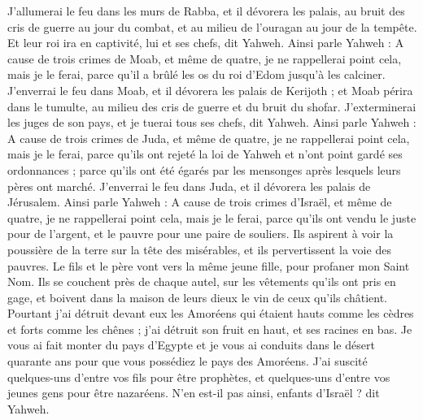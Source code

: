 \begin{multicols}{2}
J'allumerai le feu dans les murs de Rabba, et il dévorera les palais, au bruit des cris de guerre au jour du combat, et au milieu de l’ouragan au jour de la tempête.
Et leur roi ira en captivité, lui et ses chefs, dit Yahweh.
\VerseOne{}Ainsi parle Yahweh : A cause de trois crimes de Moab, et même de quatre, je ne rappellerai point cela, mais je le ferai, parce qu'il a brûlé les os du roi d'Edom jusqu’à les calciner.
J'enverrai le feu dans Moab, et il dévorera les palais de Kerijoth ; et Moab périra dans le tumulte, au milieu des cris de guerre et du bruit du shofar.
J'exterminerai les juges de son pays, et je tuerai tous ses chefs, dit Yahweh.
Ainsi parle Yahweh : A cause de trois crimes de Juda, et même de quatre, je ne rappellerai point cela, mais je le ferai, parce qu'ils ont rejeté la loi de Yahweh et n'ont point gardé ses ordonnances ; parce qu’ils ont été égarés par les mensonges après lesquels leurs pères ont marché.
J'enverrai le feu dans Juda, et il dévorera les palais de Jérusalem.
Ainsi parle Yahweh : A cause de trois crimes d'Israël, et même de quatre, je ne rappellerai point cela, mais je le ferai, parce qu'ils ont vendu le juste pour de l'argent, et le pauvre pour une paire de souliers.
Ils aspirent à voir la poussière de la terre sur la tête des misérables, et ils pervertissent la voie des pauvres. Le fils et le père vont vers la même jeune fille, pour profaner mon Saint Nom.
Ils se couchent près de chaque autel, sur les vêtements qu'ils ont pris en gage, et boivent dans la maison de leurs dieux le vin de ceux qu’ils châtient.
Pourtant j'ai détruit devant eux les Amoréens qui étaient hauts comme les cèdres et forts comme les chênes ; j'ai détruit son fruit en haut, et ses racines en bas.
Je vous ai fait monter du pays d'Egypte et je vous ai conduits dans le désert quarante ans pour que vous possédiez le pays des Amoréens.
J'ai suscité quelques-uns d'entre vos fils pour être prophètes, et quelques-uns d'entre vos jeunes gens pour être nazaréens. N'en est-il pas ainsi, enfants d'Israël ? dit Yahweh.

\end{multicols}

